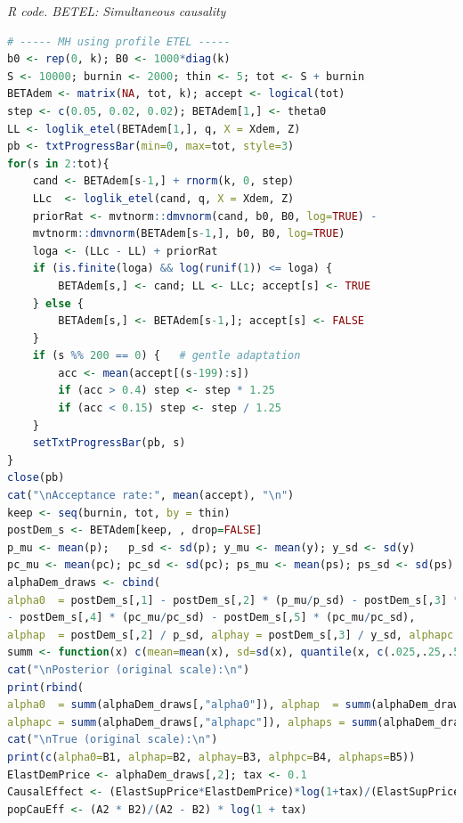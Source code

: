 \begin{enumerate}[leftmargin=*]
\begin{tcolorbox}[enhanced,width=4.67in,center upper,
	fontupper=\large\bfseries,drop shadow southwest,sharp corners]
	\textit{R code. BETEL: Simultaneous causality}
	\begin{VF}
		\begin{lstlisting}[language=R]
# ----- MH using profile ETEL -----
b0 <- rep(0, k); B0 <- 1000*diag(k)
S <- 10000; burnin <- 2000; thin <- 5; tot <- S + burnin
BETAdem <- matrix(NA, tot, k); accept <- logical(tot)
step <- c(0.05, 0.02, 0.02); BETAdem[1,] <- theta0
LL <- loglik_etel(BETAdem[1,], q, X = Xdem, Z)
pb <- txtProgressBar(min=0, max=tot, style=3)
for(s in 2:tot){
	cand <- BETAdem[s-1,] + rnorm(k, 0, step)
	LLc  <- loglik_etel(cand, q, X = Xdem, Z)
	priorRat <- mvtnorm::dmvnorm(cand, b0, B0, log=TRUE) -
	mvtnorm::dmvnorm(BETAdem[s-1,], b0, B0, log=TRUE)
	loga <- (LLc - LL) + priorRat
	if (is.finite(loga) && log(runif(1)) <= loga) {
		BETAdem[s,] <- cand; LL <- LLc; accept[s] <- TRUE
	} else {
		BETAdem[s,] <- BETAdem[s-1,]; accept[s] <- FALSE
	}
	if (s %% 200 == 0) {   # gentle adaptation
		acc <- mean(accept[(s-199):s])
		if (acc > 0.4) step <- step * 1.25
		if (acc < 0.15) step <- step / 1.25
	}
	setTxtProgressBar(pb, s)
}
close(pb)
cat("\nAcceptance rate:", mean(accept), "\n")
keep <- seq(burnin, tot, by = thin)
postDem_s <- BETAdem[keep, , drop=FALSE] 
p_mu <- mean(p);   p_sd <- sd(p); y_mu <- mean(y); y_sd <- sd(y)
pc_mu <- mean(pc); pc_sd <- sd(pc); ps_mu <- mean(ps); ps_sd <- sd(ps)
alphaDem_draws <- cbind(
alpha0  = postDem_s[,1] - postDem_s[,2] * (p_mu/p_sd) - postDem_s[,3] * (y_mu/y_sd)
- postDem_s[,4] * (pc_mu/pc_sd) - postDem_s[,5] * (pc_mu/pc_sd),
alphap  = postDem_s[,2] / p_sd, alphay = postDem_s[,3] / y_sd, alphapc = postDem_s[,4] / pc_sd, alphaps = postDem_s[,5] / ps_sd)
summ <- function(x) c(mean=mean(x), sd=sd(x), quantile(x, c(.025,.25,.5,.75,.975)))
cat("\nPosterior (original scale):\n")
print(rbind(
alpha0  = summ(alphaDem_draws[,"alpha0"]), alphap  = summ(alphaDem_draws[,"alphap"]), alphay = summ(alphaDem_draws[,"alphay"]),
alphapc = summ(alphaDem_draws[,"alphapc"]), alphaps = summ(alphaDem_draws[,"alphaps"])))
cat("\nTrue (original scale):\n")
print(c(alpha0=B1, alphap=B2, alphay=B3, alphpc=B4, alphaps=B5))
ElastDemPrice <- alphaDem_draws[,2]; tax <- 0.1
CausalEffect <- (ElastSupPrice*ElastDemPrice)*log(1+tax)/(ElastSupPrice-ElastDemPrice) 
popCauEff <- (A2 * B2)/(A2 - B2) * log(1 + tax)
\end{lstlisting}
	\end{VF}
\end{tcolorbox} 


\end{enumerate}
